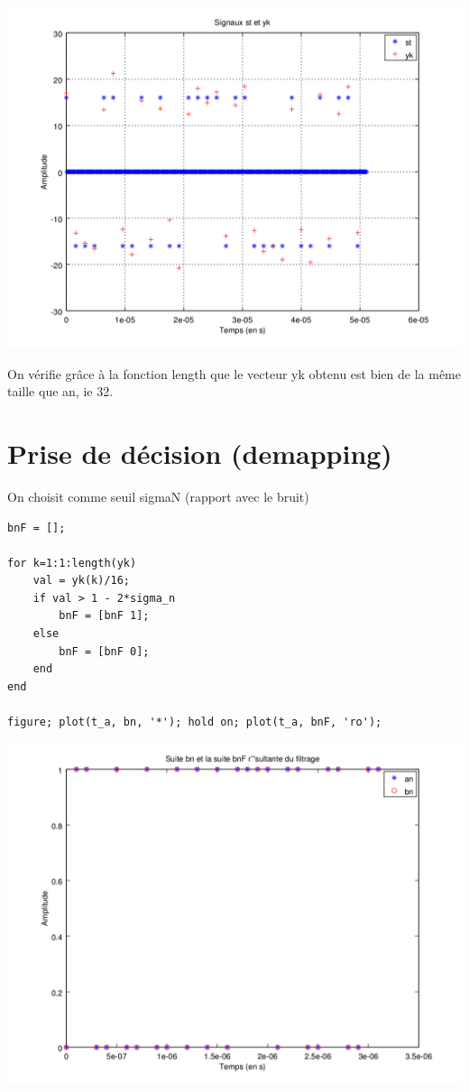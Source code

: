 \documentclass{acm_proc_article-sp}
\begin{document}
\begin{center}
\includegraphics[scale=0.45]{yk_13.png}
\end{center}

On vérifie grâce à la fonction length que le vecteur yk obtenu est bien de la même taille que an, ie 32.


\section{Prise de décision (demapping)}

On choisit comme seuil sigmaN (rapport avec le bruit)

\begin{lstlisting}
bnF = [];

for k=1:1:length(yk)
    val = yk(k)/16;
    if val > 1 - 2*sigma_n
        bnF = [bnF 1];
    else
        bnF = [bnF 0];
    end
end

figure; plot(t_a, bn, '*'); hold on; plot(t_a, bnF, 'ro');
\end{lstlisting}

\begin{center}
\includegraphics[scale=0.45]{bn_bnF_14.png}
\end{center}
\end{document}

